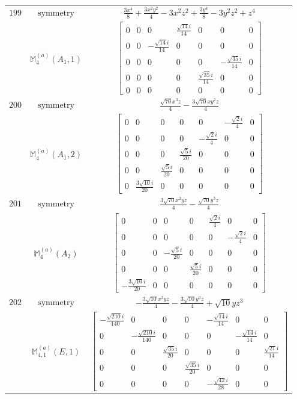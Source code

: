 \documentclass[fleqn,8pt,landscape]{jsarticle}
\begin{document}
\begin{longtable}{ccc}
$ 199 $ & $ \text{symmetry} $ & $ \frac{3 x^{4}}{8} + \frac{3 x^{2} y^{2}}{4} - 3 x^{2} z^{2} + \frac{3 y^{4}}{8} - 3 y^{2} z^{2} + z^{4} $ \\
$  $ & $ \mathbb{M}_{4}^{(a)}(A_{1},1) $ & $ \begin{bmatrix} 0 & 0 & 0 & \frac{\sqrt{14} i}{14} & 0 & 0 & 0 \\ 0 & 0 & - \frac{\sqrt{14} i}{14} & 0 & 0 & 0 & 0 \\ 0 & 0 & 0 & 0 & 0 & - \frac{\sqrt{35} i}{14} & 0 \\ 0 & 0 & 0 & 0 & \frac{\sqrt{35} i}{14} & 0 & 0 \\ 0 & 0 & 0 & 0 & 0 & 0 & 0 \end{bmatrix} $ \\ \hline
$ 200 $ & $ \text{symmetry} $ & $ \frac{\sqrt{70} x^{3} z}{4} - \frac{3 \sqrt{70} x y^{2} z}{4} $ \\
$  $ & $ \mathbb{M}_{4}^{(a)}(A_{1},2) $ & $ \begin{bmatrix} 0 & 0 & 0 & 0 & 0 & - \frac{\sqrt{2} i}{4} & 0 \\ 0 & 0 & 0 & 0 & - \frac{\sqrt{2} i}{4} & 0 & 0 \\ 0 & 0 & 0 & \frac{\sqrt{5} i}{20} & 0 & 0 & 0 \\ 0 & 0 & \frac{\sqrt{5} i}{20} & 0 & 0 & 0 & 0 \\ 0 & \frac{3 \sqrt{10} i}{20} & 0 & 0 & 0 & 0 & 0 \end{bmatrix} $ \\ \hline
$ 201 $ & $ \text{symmetry} $ & $ \frac{3 \sqrt{70} x^{2} y z}{4} - \frac{\sqrt{70} y^{3} z}{4} $ \\
$  $ & $ \mathbb{M}_{4}^{(a)}(A_{2}) $ & $ \begin{bmatrix} 0 & 0 & 0 & 0 & \frac{\sqrt{2} i}{4} & 0 & 0 \\ 0 & 0 & 0 & 0 & 0 & - \frac{\sqrt{2} i}{4} & 0 \\ 0 & 0 & - \frac{\sqrt{5} i}{20} & 0 & 0 & 0 & 0 \\ 0 & 0 & 0 & \frac{\sqrt{5} i}{20} & 0 & 0 & 0 \\ - \frac{3 \sqrt{10} i}{20} & 0 & 0 & 0 & 0 & 0 & 0 \end{bmatrix} $ \\ \hline
$ 202 $ & $ \text{symmetry} $ & $ - \frac{3 \sqrt{10} x^{2} y z}{4} - \frac{3 \sqrt{10} y^{3} z}{4} + \sqrt{10} y z^{3} $ \\
$  $ & $ \mathbb{M}_{4,1}^{(a)}(E,1) $ & $ \begin{bmatrix} - \frac{\sqrt{210} i}{140} & 0 & 0 & 0 & - \frac{\sqrt{14} i}{14} & 0 & 0 \\ 0 & - \frac{\sqrt{210} i}{140} & 0 & 0 & 0 & - \frac{\sqrt{14} i}{14} & 0 \\ 0 & 0 & \frac{\sqrt{35} i}{20} & 0 & 0 & 0 & \frac{\sqrt{21} i}{14} \\ 0 & 0 & 0 & \frac{\sqrt{35} i}{20} & 0 & 0 & 0 \\ 0 & 0 & 0 & 0 & - \frac{\sqrt{42} i}{28} & 0 & 0 \end{bmatrix} $ \\ \hline

\end{longtable}
\end{document}
